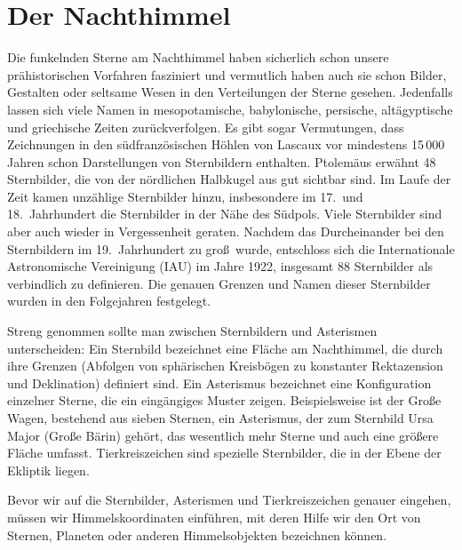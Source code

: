 
\chapter{Der Nachthimmel}
\label{chap_Nachthimmel}

%
Die funkelnden Sterne am Nachthimmel haben sicherlich schon unsere pr\"ahistorischen Vorfahren
fasziniert und vermutlich haben auch sie schon Bilder, Gestalten
oder seltsame Wesen in den Verteilungen der Sterne gesehen. Jedenfalls lassen sich viele
Namen in mesopotamische, babylonische, persische, alt\"agyptische und griechische
Zeiten zur\"uckverfolgen. Es gibt sogar Vermutungen, dass Zeichnungen in den
s\"udfranz\"osischen H\"ohlen von Lascaux vor mindestens 15\,000 Jahren schon Darstellungen
von Sternbildern enthalten. 
Ptolem\"aus erw\"ahnt 48 Sternbilder, die von der n\"ordlichen
Halbkugel aus gut sichtbar sind. Im Laufe der Zeit kamen unz\"ahlige Sternbilder hinzu,
insbesondere im 17.\ und 18.\ Jahrhundert die Sternbilder in der N\"ahe des S\"udpols. Viele Sternbilder
sind aber auch wieder in Vergessenheit geraten.
Nachdem das Durcheinander bei den Sternbildern im 19.\ Jahrhundert
zu gro\ss\ wurde, entschloss sich die Internationale Astronomische Vereinigung (IAU) im Jahre
1922, insgesamt 88 Sternbilder als verbindlich zu definieren. Die genauen Grenzen und
Namen dieser Sternbilder wurden in den Folgejahren festgelegt. 

Streng genommen sollte man zwischen Sternbildern und Asterismen 
unterscheiden:
Ein Sternbild bezeichnet eine Fl\"ache am Nachthimmel, die durch ihre Grenzen
(Abfolgen von sph\"arischen Kreisb\"ogen zu konstanter Rektazension und Deklination) definiert sind.
Ein Asterismus bezeichnet eine Konfiguration einzelner Sterne, die ein eing\"angiges
Muster zeigen. Beispielsweise ist der Gro\ss e Wagen, 
bestehend aus sieben Sternen,
ein Asterismus, der zum Sternbild Ursa Major (Gro\ss e B\"arin) geh\"ort, das wesentlich
mehr Sterne und auch eine gr\"o\ss ere Fl\"ache umfasst. Tierkreiszeichen sind spezielle
Sternbilder, die in der Ebene der Ekliptik liegen. 

Bevor wir auf die Sternbilder, Asterismen und Tierkreiszeichen genauer eingehen, m\"ussen
wir Himmelskoordinaten einf\"uhren, mit deren Hilfe wir den Ort von Sternen, Planeten oder anderen
Himmelsobjekten bezeichnen k\"onnen.   

